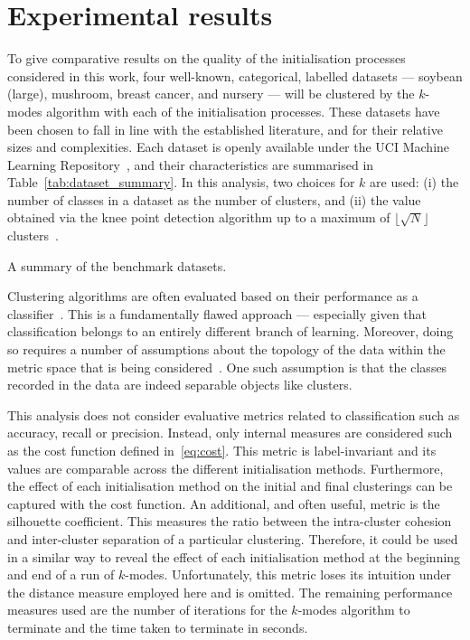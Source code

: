 \section{Experimental results}\label{sec:results}

To give comparative results on the quality of the initialisation processes
considered in this work, four well-known, categorical, labelled datasets ---
soybean (large), mushroom, breast cancer, and nursery --- will be clustered by
the \(k\)-modes algorithm with each of the initialisation processes. These
datasets have been chosen to fall in line with the established literature, and
for their relative sizes and complexities. Each dataset is openly available
under the UCI Machine Learning Repository~\cite{Dua2019}, and their
characteristics are summarised in Table~\ref{tab:dataset_summary}. In this
analysis, two choices for \(k\) are used: (i) the number of classes in a
dataset as the number of clusters, and (ii) the value obtained via the knee
point detection algorithm up to a maximum of
\(\lfloor\sqrt{N}\rfloor\) clusters~\cite{Satopaa2011}.

\begin{table}[htbp]
    \resizebox{\textwidth}{!}{%
        
    }\caption{A summary of the benchmark datasets.}\label{tab:dataset_summary}
\end{table}

Clustering algorithms are often evaluated based on their performance as a
classifier~\cite{%
    Arthur2007,Cao2009,Cao2012,Huang1998,Ng2007,Olaode2014,Schaeffer2007%
}. This is a fundamentally flawed approach --- especially given that
classification belongs to an entirely different branch of learning. Moreover,
doing so requires a number of assumptions about the topology of the data within
the metric space that is being considered~\cite{Memoli2011}. One such assumption
is that the classes recorded in the data are indeed separable objects like
clusters.

This analysis does not consider evaluative metrics related to classification
such as accuracy, recall or precision. Instead, only internal measures are
considered such as the cost function defined in~\eqref{eq:cost}. This metric is
label-invariant and its values are comparable across the different
initialisation methods. Furthermore, the effect of each initialisation method
on the initial and final clusterings can be captured with the cost function. An
additional, and often useful, metric is the silhouette coefficient. This
measures the ratio between the intra-cluster cohesion and inter-cluster
separation of a particular clustering. Therefore, it could be used in a similar
way to reveal the effect of each initialisation method at the beginning and end
of a run of \(k\)-modes. Unfortunately, this metric loses its intuition under
the distance measure employed here and is omitted. The remaining performance
measures used are the number of iterations for the \(k\)-modes algorithm to
terminate and the time taken to terminate in seconds.

